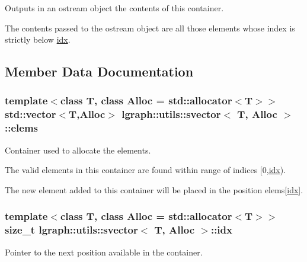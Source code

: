 Outputs in an ostream object the contents of this container. 

The contents passed to the ostream object are all those elements whose index is strictly below \hyperlink{classlgraph_1_1utils_1_1svector_a7ef963c079c7dc8a6a559ceef81a241f}{idx}. 

\subsection{Member Data Documentation}
\hypertarget{classlgraph_1_1utils_1_1svector_aa72e9ffeb58f88d3cb01671e3e672a45}{
\subsubsection[{elems}]{\setlength{\rightskip}{0pt plus 5cm}template$<$class T, class Alloc = std\-::allocator$<$\-T$>$$>$ std\-::vector$<$T,Alloc$>$ {\bf lgraph\-::utils\-::svector}$<$ T, Alloc $>$\-::elems\hspace{0.3cm}{\ttfamily [private]}}}\label{classlgraph_1_1utils_1_1svector_aa72e9ffeb58f88d3cb01671e3e672a45}


Container used to allocate the elements. 

The valid elements in this container are found within range of indices \mbox{[}0,\hyperlink{classlgraph_1_1utils_1_1svector_a7ef963c079c7dc8a6a559ceef81a241f}{idx}).

The new element added to this container will be placed in the position elems\mbox{[}\hyperlink{classlgraph_1_1utils_1_1svector_a7ef963c079c7dc8a6a559ceef81a241f}{idx}\mbox{]}. \hypertarget{classlgraph_1_1utils_1_1svector_a7ef963c079c7dc8a6a559ceef81a241f}{
\subsubsection[{idx}]{\setlength{\rightskip}{0pt plus 5cm}template$<$class T, class Alloc = std\-::allocator$<$\-T$>$$>$ size\-\_\-t {\bf lgraph\-::utils\-::svector}$<$ T, Alloc $>$\-::idx\hspace{0.3cm}{\ttfamily [private]}}}\label{classlgraph_1_1utils_1_1svector_a7ef963c079c7dc8a6a559ceef81a241f}


Pointer to the next position available in the container. 

